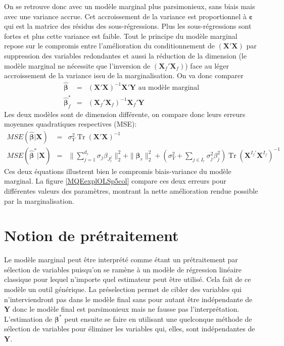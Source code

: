 \documentclass[12pt,a4paper]{report}
\begin{document}
On se retrouve donc avec un modèle marginal plus parsimonieux, sans biais mais avec une variance accrue. Cet accroissement de la variance est proportionnel à $\boldsymbol{\varepsilon}$ qui est la matrice des résidus des sous-régressions. Plus les sous-régressions sont fortes et plus cette variance est faible.
Tout le principe du modèle marginal repose sur le compromis entre l'amélioration du conditionnement de $(\boldsymbol{X}'\boldsymbol{X})$ par suppression des variables redondantes et aussi la réduction de la dimension (le modèle marginal ne nécessite que l'inversion de $(\boldsymbol{X}_{f}'\boldsymbol{X}_{f})$) face au léger accroissement de la variance issu de la marginalisation.
On va donc comparer 
	\begin{eqnarray}
		\hat{\boldsymbol{\beta}}&=& (\boldsymbol{X}'\boldsymbol{X})^{-1}\boldsymbol{X}'\boldsymbol{Y} \textrm{ au modèle marginal} \\
		\hat{\boldsymbol{\beta}}^*_f&=& (\boldsymbol{X}_{f}'\boldsymbol{X}_{f})^{-1}\boldsymbol{X}_{f}'\boldsymbol{Y}
	\end{eqnarray}
	Les deux modèles sont de dimension différente, on compare donc leurs erreurs moyennes quadratiques respectives (MSE):
	\begin{eqnarray}
		MSE(\hat{\boldsymbol{\beta}}|\boldsymbol{X})&=& \sigma^2_Y \operatorname{Tr}(\boldsymbol{X}'\boldsymbol{X})^{-1}  \\
		MSE(\hat{\boldsymbol{\beta}}^*|\boldsymbol{X})&=&\parallel \sum_{j=1}^{d_r}\sigma_j \beta_{J_r^j} \parallel_2^2+\parallel\boldsymbol{\beta}_r  \parallel_2^2 +(\sigma^2_Y+\sum_{j \in I_r}\sigma^2_{j}\beta_{j}^2)\operatorname{Tr}(\boldsymbol{X}^{I_f'}\boldsymbol{X}^{I_f})^{-1}
	\end{eqnarray}
		Ces deux équations illustrent bien le compromis biais-variance du modèle marginal.
		La figure \ref{MQEexplOLSp5col} compare ces deux erreurs pour différentes valeurs des paramètres, montrant la nette amélioration rendue possible par la marginalisation.
	
	\section{Notion de prétraitement}
	Le modèle marginal peut être interprété comme étant un prétraitement par sélection de variables puisqu'on se ramène à un modèle de régression linéaire classique pour lequel n'importe quel estimateur peut être utilisé. Cela fait de ce modèle un outil générique. La préselection permet de cibler des variables qui n'interviendront pas dans le modèle final sans pour autant être indépendante de $\boldsymbol{Y}$ donc le modèle final est parsimonieux mais ne fausse pas l'interprétation. L'estimation de $\boldsymbol{\beta}^*$ peut ensuite se faire en utilisant une quelconque méthode de sélection de variables pour éliminer les variables qui, elles, sont indépendantes de $\boldsymbol{Y}$.\\
	
\end{document}
